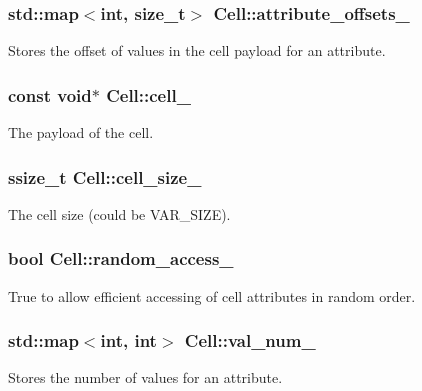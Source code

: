 \subsubsection[{attribute\+\_\+offsets\+\_\+}]{\setlength{\rightskip}{0pt plus 5cm}std\+::map$<$int, size\+\_\+t$>$ Cell\+::attribute\+\_\+offsets\+\_\+\hspace{0.3cm}{\ttfamily [private]}}\label{classCell_a6cd2bfab023084db0a9ee46fb45b6d72}
Stores the offset of values in the cell payload for an attribute. \hypertarget{classCell_a27e0be2201816f19f4a7c69b8dd25126}{}
\subsubsection[{cell\+\_\+}]{\setlength{\rightskip}{0pt plus 5cm}const void$\ast$ Cell\+::cell\+\_\+\hspace{0.3cm}{\ttfamily [private]}}\label{classCell_a27e0be2201816f19f4a7c69b8dd25126}
The payload of the cell. \hypertarget{classCell_af2af1e38aff4ad286d1f5d47dd6e0113}{}
\subsubsection[{cell\+\_\+size\+\_\+}]{\setlength{\rightskip}{0pt plus 5cm}ssize\+\_\+t Cell\+::cell\+\_\+size\+\_\+\hspace{0.3cm}{\ttfamily [private]}}\label{classCell_af2af1e38aff4ad286d1f5d47dd6e0113}
The cell size (could be V\+A\+R\+\_\+\+S\+I\+Z\+E). \hypertarget{classCell_a8c2ed27de7e47d9d9bba751b12ee863b}{}
\subsubsection[{random\+\_\+access\+\_\+}]{\setlength{\rightskip}{0pt plus 5cm}bool Cell\+::random\+\_\+access\+\_\+\hspace{0.3cm}{\ttfamily [private]}}\label{classCell_a8c2ed27de7e47d9d9bba751b12ee863b}
True to allow efficient accessing of cell attributes in random order. \hypertarget{classCell_aa5c13924cd2dde61d824d7161004b104}{}
\subsubsection[{val\+\_\+num\+\_\+}]{\setlength{\rightskip}{0pt plus 5cm}std\+::map$<$int, int$>$ Cell\+::val\+\_\+num\+\_\+\hspace{0.3cm}{\ttfamily [private]}}\label{classCell_aa5c13924cd2dde61d824d7161004b104}
Stores the number of values for an attribute. \hypertarget{classCell_a83cd3e9053931b72bf5a783d3104a20f}{}
